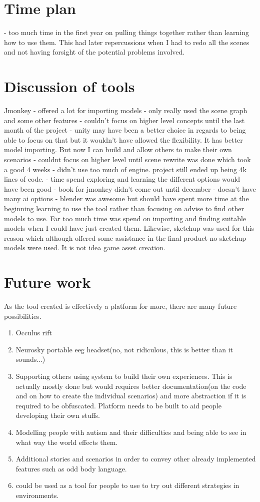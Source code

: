 \documentclass[11pt]{report}
\begin{document}
\section{Time plan}
- too much time in the first year on pulling things together rather than learning how to use them. This had later repercussions when I had to redo all the scenes and not having forsight of the potential problems involved.

\section{Discussion of tools}
Jmonkey
- offered a lot for importing models
- only really used the scene graph and some other features
- couldn't focus on higher level concepts until the last month of the project
- unity may have been a better choice in regards to being able to focus on that but it wouldn't have allowed the flexibility. It has better model importing. But now I can build and allow others to make their own scenarios
- couldnt focus on higher level until scene rewrite was done which took a good 4 weeks
- didn't use too much of engine. project still ended up being 4k lines of code.
- time spend exploring and learning the different options would have been good
- book for jmonkey didn't come out until december
- doesn't have many ai options
- blender was awesome but should have spent more time at the beginning learning to use the tool rather than focusing on advise to find other models to use. Far too much time was spend on importing and finding suitable models when I could have just created them. Likewise, sketchup was used for this reason which although offered some assistance in the final product no sketchup models were used. It is not idea game asset creation.

\section{Future work}

As the tool created is effectively a platform for more, there are many future possibilities. 
\begin{enumerate}
\item Occulus rift
\item Neurosky portable eeg headset(no, not ridiculous, this is better than it sounds...)
\item Supporting others using system to build their own experiences. This is actually mostly done but would requires better documentation(on the code and on how to create the individual scenarios) and more abstraction if it is required to be obfuscated. Platform needs to be built to aid people developing their own stuffs. 
\item Modelling people with autism and their difficulties and being able to see in what way the world effects them. 
\item Additional stories and scenarios in order to convey other already implemented features such as odd body language. 
\item could be used as a tool for people to use to try out different strategies in environments. 
\end{enumerate}
\end{document}
